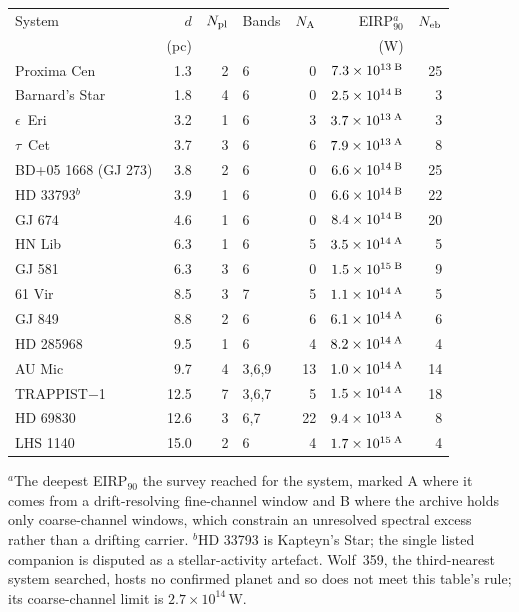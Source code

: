 \begin{tabular}{@{}l@{~~}r@{~~}r@{~~}l@{~~}r@{~~}r@{~~}r@{}}
\hline
System & $d$ & $N_{\rm pl}$ & Bands & $N_{\rm A}$ & EIRP$_{90}^{a}$ & $N_{\rm eb}$ \\
 & (pc) & & & & (W) & \\
\hline
Proxima Cen & 1.3 & 2 & 6 & 0 & $7.3\times10^{13}\,^{\rm B}$ & 25 \\
Barnard's Star & 1.8 & 4 & 6 & 0 & $2.5\times10^{14}\,^{\rm B}$ & 3 \\
$\epsilon$~Eri & 3.2 & 1 & 6 & 3 & $3.7\times10^{13}\,^{\rm A}$ & 3 \\
$\tau$~Cet & 3.7 & 3 & 6 & 6 & $7.9\times10^{13}\,^{\rm A}$ & 8 \\
BD+05 1668 (GJ 273) & 3.8 & 2 & 6 & 0 & $6.6\times10^{14}\,^{\rm B}$ & 25 \\
HD 33793$^{b}$ & 3.9 & 1 & 6 & 0 & $6.6\times10^{14}\,^{\rm B}$ & 22 \\
GJ 674 & 4.6 & 1 & 6 & 0 & $8.4\times10^{14}\,^{\rm B}$ & 20 \\
HN Lib & 6.3 & 1 & 6 & 5 & $3.5\times10^{14}\,^{\rm A}$ & 5 \\
GJ 581 & 6.3 & 3 & 6 & 0 & $1.5\times10^{15}\,^{\rm B}$ & 9 \\
61 Vir & 8.5 & 3 & 7 & 5 & $1.1\times10^{14}\,^{\rm A}$ & 5 \\
GJ 849 & 8.8 & 2 & 6 & 6 & $6.1\times10^{14}\,^{\rm A}$ & 6 \\
HD 285968 & 9.5 & 1 & 6 & 4 & $8.2\times10^{14}\,^{\rm A}$ & 4 \\
AU Mic & 9.7 & 4 & 3,6,9 & 13 & $1.0\times10^{14}\,^{\rm A}$ & 14 \\
TRAPPIST$-$1 & 12.5 & 7 & 3,6,7 & 5 & $1.5\times10^{14}\,^{\rm A}$ & 18 \\
HD 69830 & 12.6 & 3 & 6,7 & 22 & $9.4\times10^{13}\,^{\rm A}$ & 8 \\
LHS 1140 & 15.0 & 2 & 6 & 4 & $1.7\times10^{15}\,^{\rm A}$ & 4 \\
\hline
\end{tabular}

{\footnotesize $^{a}$The deepest EIRP$_{90}$ the survey reached for the system, marked A where it comes from a drift-resolving fine-channel window and B where the archive holds only coarse-channel windows, which constrain an unresolved spectral excess rather than a drifting carrier. $^{b}$HD 33793 is Kapteyn's Star; the single listed companion is disputed as a stellar-activity artefact. Wolf~359, the third-nearest system searched, hosts no confirmed planet and so does not meet this table's rule; its coarse-channel limit is $2.7\times10^{14}$\,W.}
